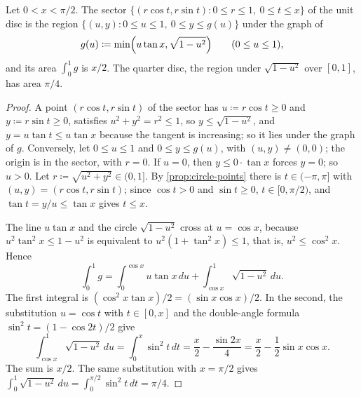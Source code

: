 \begin{proposition}
\label{prop:sector-area}
Let $0<x<\pi/2$. The sector $\{(r\cos t,r\sin t): 0\le r\le1,\ 0\le t\le x\}$ of the unit disc is the region $\{(u,y): 0\le u\le1,\ 0\le y\le g(u)\}$ under the graph of
\[
g(u)\coloneqq\min\Bigl(u\tan x,\sqrt{1-u^2}\Bigr)\qquad(0\le u\le1),
\]
and its area $\int_0^1g$ is $x/2$. The quarter disc, the region under $\sqrt{1-u^2}$ over $[0,1]$, has area $\pi/4$.
\end{proposition}

\begin{proof}
A point $(r\cos t,r\sin t)$ of the sector has $u\coloneqq r\cos t\ge0$ and $y\coloneqq r\sin t\ge0$, satisfies $u^2+y^2=r^2\le1$, so $y\le\sqrt{1-u^2}$, and $y=u\tan t\le u\tan x$ because the tangent is increasing; so it lies under the graph of $g$. Conversely, let $0\le u\le1$ and $0\le y\le g(u)$, with $(u,y)\ne(0,0)$; the origin is in the sector, with $r=0$. If $u=0$, then $y\le0\cdot\tan x$ forces $y=0$; so $u>0$. Let $r\coloneqq\sqrt{u^2+y^2}\in(0,1]$. By \cref{prop:circle-points} there is $t\in(-\pi,\pi]$ with $(u,y)=(r\cos t,r\sin t)$; since $\cos t>0$ and $\sin t\ge0$, $t\in[0,\pi/2)$, and $\tan t=y/u\le\tan x$ gives $t\le x$.

The line $u\tan x$ and the circle $\sqrt{1-u^2}$ cross at $u=\cos x$, because $u^2\tan^2x\le1-u^2$ is equivalent to $u^2(1+\tan^2x)\le1$, that is, $u^2\le\cos^2x$. Hence
\[
\int_0^1g=\int_0^{\cos x}u\tan x\,du+\int_{\cos x}^1\sqrt{1-u^2}\,du .
\]
The first integral is $(\cos^2x\tan x)/2=(\sin x\cos x)/2$. In the second, the substitution $u=\cos t$ with $t\in[0,x]$ and the double-angle formula $\sin^2t=(1-\cos2t)/2$ give
\[
\int_{\cos x}^1\sqrt{1-u^2}\,du=\int_0^x\sin^2t\,dt=\frac x2-\frac{\sin2x}4=\frac x2-\frac12\sin x\cos x .
\]
The sum is $x/2$. The same substitution with $x=\pi/2$ gives $\int_0^1\sqrt{1-u^2}\,du=\int_0^{\pi/2}\sin^2t\,dt=\pi/4$.
\end{proof}

